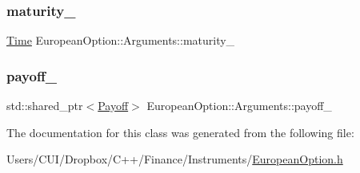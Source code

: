 \subsubsection{\texorpdfstring{maturity\+\_\+}{maturity\_}}
{\footnotesize\ttfamily \hyperlink{_name_def_8h_ac2d3e0ba793497bcca555c7c2cf64ff3}{Time} European\+Option\+::\+Arguments\+::maturity\+\_\+}

\hypertarget{class_european_option_1_1_arguments_a01a26c6641a2bb9f439c4191c5eb7d76}{}\label{class_european_option_1_1_arguments_a01a26c6641a2bb9f439c4191c5eb7d76} 
\subsubsection{\texorpdfstring{payoff\+\_\+}{payoff\_}}
{\footnotesize\ttfamily std\+::shared\+\_\+ptr$<$\hyperlink{class_payoff}{Payoff}$>$ European\+Option\+::\+Arguments\+::payoff\+\_\+}



The documentation for this class was generated from the following file\+:\begin{DoxyCompactItemize}
\item 
Users/\+C\+U\+I/\+Dropbox/\+C++/\+Finance/\+Instruments/\hyperlink{_european_option_8h}{European\+Option.\+h}\end{DoxyCompactItemize}
